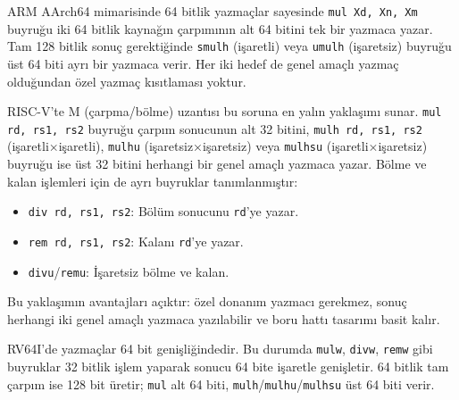 ARM AArch64 mimarisinde 64 bitlik yazmaçlar sayesinde \texttt{mul Xd, Xn, Xm} buyruğu iki 64 bitlik kaynağın çarpımının alt 64 bitini tek bir yazmaca yazar. Tam 128 bitlik sonuç gerektiğinde \texttt{smulh} (işaretli) veya \texttt{umulh} (işaretsiz) buyruğu üst 64 biti ayrı bir yazmaca verir. Her iki hedef de genel amaçlı yazmaç olduğundan özel yazmaç kısıtlaması yoktur.

RISC-V'te M (çarpma/bölme) uzantısı bu soruna en yalın yaklaşımı sunar. \texttt{mul rd, rs1, rs2} buyruğu çarpım sonucunun alt 32 bitini, \texttt{mulh rd, rs1, rs2} (işaretli×işaretli), \texttt{mulhu} (işaretsiz×işaretsiz) veya \texttt{mulhsu} (işaretli×işaretsiz) buyruğu ise üst 32 bitini herhangi bir genel amaçlı yazmaca yazar. Bölme ve kalan işlemleri için de ayrı buyruklar tanımlanmıştır:

\begin{itemize}[nosep]
\item \texttt{div rd, rs1, rs2}: Bölüm sonucunu \texttt{rd}'ye yazar.
\item \texttt{rem rd, rs1, rs2}: Kalanı \texttt{rd}'ye yazar.
\item \texttt{divu}/\texttt{remu}: İşaretsiz bölme ve kalan.
\end{itemize}

Bu yaklaşımın avantajları açıktır: özel donanım yazmacı gerekmez, sonuç herhangi iki genel amaçlı yazmaca yazılabilir ve boru hattı tasarımı basit kalır.

\begin{bilginot}
RV64I'de yazmaçlar 64 bit genişliğindedir. Bu durumda \texttt{mulw}, \texttt{divw}, \texttt{remw} gibi buyruklar 32 bitlik işlem yaparak sonucu 64 bite işaretle genişletir. 64 bitlik tam çarpım ise 128 bit üretir; \texttt{mul} alt 64 biti, \texttt{mulh}/\texttt{mulhu}/\texttt{mulhsu} üst 64 biti verir.
\end{bilginot}

